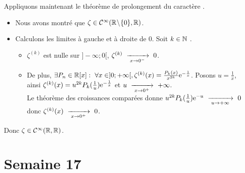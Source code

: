 \documentclass{article}
\renewenvironment{question_kholle}[2][ ]
{
	\subsection{\texorpdfstring{#2}{}}
	\notblank{#1}
	{
		\noindent #1
		\bigbreak
	}
	{}
	\begin{proof}
}
{
	\end{proof}
}
\begin{document}
\begin{question_kholle}
\begin{itemize}[label=$\star$]
		      Appliquons maintenant le théorème de prolongement du caractère \Cont{\infty}{}{}.
		      \begin{itemize}[label=$\star$]
			      \item Nous avons montré que $\zeta \in  \Cont{\infty}{\R \!\setminus\! \{0\}}{}$.
			      \item Calculons les limites à gauche et à droite de 0. Soit $k \in \mathbb N$ \fq.
			            \begin{itemize}[label=$\star\star$]
				            \item $\zeta^{(k)}$ est nulle sur $]-\infty;0[$, $\zeta^{(k)} \ \xrightarrow[\;x \to 0^-\;]{}\  0$.
				            \item De plus, $\exists P_n \in \R[x] : \ \forall x \in ]0;+\infty[, \zeta^{(k)}(x) = \frac{P_k(x)}{x^{2k}} \e^{-\frac{1}{x}}$. Posons $u = \frac{1}{x}$, ainsi $\zeta^{(k)}(x) = u^{2k} P_k(\frac{1}{u}) \mathrm e^{-\frac{1}{x}}$ et $u \ \xrightarrow[\;x \to 0^+\;]{}\  +\infty$. \\
				                  Le théorème des croissances comparées donne $u^{2k} P_k(\frac{1}{u}) \mathrm e^{-u} \ \xrightarrow[\;u \to +\infty\;]{}\  0$ donc $\zeta^{(k)}(x) \ \xrightarrow[\;x \to 0^+\;]{}\  0$.
			            \end{itemize}
		      \end{itemize}
		      Donc $\zeta \in \Cont{\infty}{\R}{\R}$.
	\end{itemize}
\end{question_kholle}
\pagebreak\section{Semaine 17}
\end{document}
